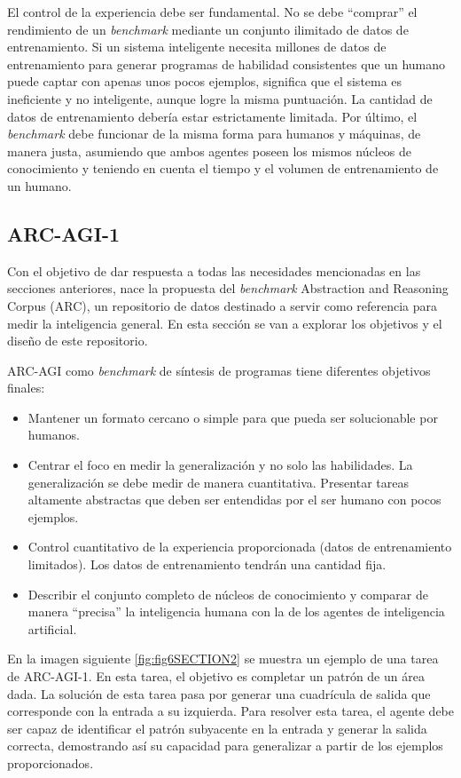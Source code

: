 \documentclass[11pt,a4paper,spanish]{book}
\numberwithin{equation}{chapter}
\numberwithin{figure}{chapter}
\begin{document}
El control de la experiencia debe ser fundamental. No se debe ``comprar'' el rendimiento de un \textit{benchmark} mediante un conjunto ilimitado de datos de entrenamiento. Si un sistema inteligente
necesita millones de datos de entrenamiento para generar programas de habilidad consistentes que un humano puede captar con apenas unos pocos ejemplos, significa que el sistema es ineficiente y no inteligente,
aunque logre la misma puntuación. La cantidad de datos de entrenamiento debería estar estrictamente limitada. Por último, el \textit{benchmark} debe funcionar de la misma forma para humanos y máquinas, de manera justa, asumiendo que
ambos agentes poseen los mismos núcleos de conocimiento y teniendo en cuenta el tiempo y el volumen de entrenamiento de un humano.

\subsection{ARC-AGI-1}

Con el objetivo de dar respuesta a todas las necesidades mencionadas en las secciones anteriores, nace la propuesta del \textit{benchmark} Abstraction and Reasoning Corpus (ARC), un repositorio de datos 
destinado a servir como referencia para medir la inteligencia general. En esta sección se van a explorar los objetivos y el diseño de este repositorio.

ARC-AGI como \textit{benchmark} de síntesis de programas tiene diferentes objetivos finales:
\begin{itemize}
\item Mantener un formato cercano o simple para que pueda ser solucionable por humanos.
\item Centrar el foco en medir la generalización y no solo las habilidades. La generalización se debe medir de manera cuantitativa. Presentar tareas altamente abstractas que deben ser entendidas por el ser humano con pocos
ejemplos.
\item Control cuantitativo de la experiencia proporcionada (datos de entrenamiento limitados). Los datos de entrenamiento tendrán una cantidad fija.
\item Describir el conjunto completo de núcleos de conocimiento y comparar de manera ``precisa'' la inteligencia humana con la de los agentes de inteligencia artificial.
\end{itemize}

En la imagen siguiente \ref{fig:fig6SECTION2} se muestra un ejemplo de una tarea de ARC-AGI-1. En esta tarea, el objetivo es completar un patrón de un área dada. La solución de esta tarea pasa por generar una cuadrícula
de salida que corresponde con la entrada a su izquierda. Para resolver esta tarea, el agente debe ser capaz de identificar el patrón subyacente en la entrada y generar la salida correcta, demostrando así su capacidad para 
generalizar a partir de los ejemplos proporcionados.
\end{document}
